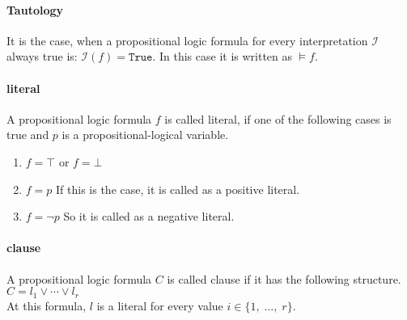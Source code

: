 \paragraph{Tautology}
It is the case, when a propositional logic formula for every interpretation $\mathcal{I}$ always true is: $\mathcal{I}(f) = \texttt{True}$. In this case it is written as $\models f$.

\paragraph{literal}
A propositional logic formula $f$ is called literal, if one of the following cases is true and $p$ is a propositional-logical variable.

\begin{enumerate}
  \item $f = \top$ or $f = \bot$
  \item $f = p$ If this is the case, it is called as a positive literal.
  \item $f = \neg p$ So it is called as a negative literal.
\end{enumerate}

\paragraph{clause}
A propositional logic formula $C$ is called clause if it has the following structure.
\\[0.2cm]
\hspace*{1.3cm} $C = l_1 \vee \cdots \vee l_r$ \\[0.2cm] At this formula, $l$ is a literal for every value $i \in \{1,\; ...,\; r\}$.

